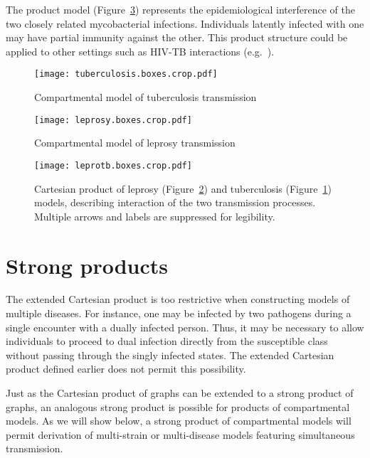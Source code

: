\documentclass[review]{elsarticle}
\newcommand{\hl}[1]{#1}
\begin{document}
The product model (\hl{Figure~\mbox{\ref{fig:leprosy-TB}}})
represents the epidemiological interference of the two closely
related mycobacterial infections.
Individuals latently infected with one may have partial immunity
against the other.
This product structure could be applied to other settings
such as HIV-TB interactions (e.g.\ \cite{porco2001amplification}).



\begin{figure}
\centering
\texttt{[image: tuberculosis.boxes.crop.pdf]}

\caption{ \label{fig:TB}
Compartmental model of tuberculosis transmission
}
\end{figure}

\begin{figure}
\centering
\texttt{[image: leprosy.boxes.crop.pdf]}

\caption{ \label{fig:leprosy}
Compartmental model of leprosy transmission
}
\end{figure}

\begin{figure}
\centering
\texttt{[image: leprotb.boxes.crop.pdf]}

\caption{ \label{fig:leprosy-TB}
Cartesian product of leprosy (Figure~\ref{fig:leprosy}) and
tuberculosis (Figure~\ref{fig:TB}) models, describing
interaction of the two transmission processes.
Multiple arrows and labels are suppressed for legibility.
}
\end{figure}

\section{Strong products}

The extended Cartesian product is too
restrictive when constructing models of multiple diseases.  For instance,
one may be infected by two pathogens during a single
encounter with a dually infected person.  Thus, it may be necessary to
allow individuals to 
proceed to dual infection directly from the susceptible class without
passing through the singly infected states.  The extended
Cartesian product defined earlier does not permit this possibility.

Just as the Cartesian product of graphs can be
extended to a strong product of graphs, an analogous strong product
is possible for products of compartmental models.
As we will show below, a strong product of compartmental
models will permit derivation of multi-strain or multi-disease
models featuring simultaneous transmission.
\end{document}
